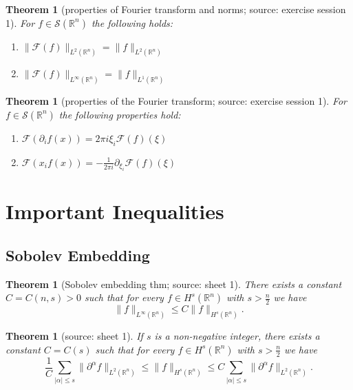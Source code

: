 \documentclass[12pt,a4paper]{article}
\newtheorem{thm}[definition]{Theorem}
\begin{document}
\begin{thm}[properties of Fourier transform and norms; source: exercise session 1]
For $f\in \mathcal{S}(\mathbb{R}^n)$ the following holds:
\begin{enumerate}
\item $\lVert \mathcal{F}(f) \rVert_{L^2(\mathbb{R}^n)} = \lVert f \rVert_{L^2(\mathbb{R}^n)}$
\item $\lVert \mathcal{F}(f) \rVert_{L^{\infty}(\mathbb{R}^n)} = \lVert f \rVert_{L^1(\mathbb{R}^n)}$
\end{enumerate}
\end{thm}

\begin{thm}[properties of the Fourier transform; source: exercise session 1]
For $f\in \mathcal{S}(\mathbb{R}^n)$ the following properties hold:
\begin{enumerate}
\item $\mathcal{F}(\partial_if(x))=2\pi i \xi_i \mathcal{F}(f)(\xi)$ 
\item $\mathcal{F}(x_if(x))=-\frac{1}{2\pi i} \partial_{\xi_i} \mathcal{F}(f)(\xi)$
\end{enumerate}
\end{thm}

\section{Important Inequalities}

\subsection{Sobolev Embedding}

\begin{thm}[Sobolev embedding thm; source: sheet 1]
There exists a constant $C=C(n,s)>0$ such that for every $f\in H^s(\mathbb{R}^n)$ with $s>\frac{n}{2}$ we have
\begin{equation}
\lVert f \rVert_{L^{\infty}(\mathbb{R}^n)} \leq C \lVert f \rVert _{H^s(\mathbb{R}^n)}.
\end{equation}
\end{thm}

\begin{thm}[source: sheet 1]
If $s$ is a non-negative integer, there exists a constant $C=C(s)$ such that for every $f\in H^s(\mathbb{R}^n)$ with $s>\frac{n}{2}$ we have
\begin{equation}
\frac{1}{C} \sum_{\lvert\alpha\rvert\leq s} \lVert \partial ^{\alpha} f \rVert_{L^2(\mathbb{R}^n)} \leq \lVert f \rVert _{H^s(\mathbb{R}^n)} \leq C \sum_{\lvert\alpha\rvert\leq s} \lVert \partial ^{\alpha} f \rVert_{L^2(\mathbb{R}^n)}.
\end{equation}
\end{thm}
\end{document}
